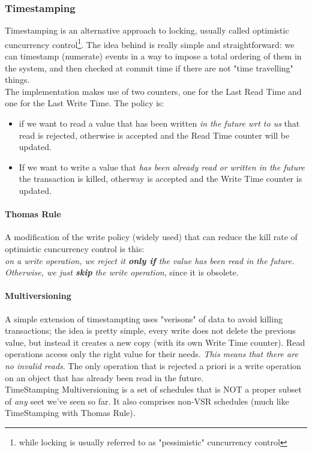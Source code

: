 \documentclass{article}
\begin{document}
				\subsubsection{Timestamping}
					Timestamping is an alternative approach to locking, usually called optimistic cuncurrency control\footnote{while locking is usually referred to as "pessimistic" cuncurrency control}. The idea behind is really simple and straightforward: we can timestamp (numerate) events in a way to impose a total ordering of them in the system, and then checked at commit time if there are not "time travelling" things. \\
					The implementation makes use of two counters, one for the Last Read Time and one for the Last Write Time. The policy is: 
					\begin{itemize}
						\item if we want to read a value that has been written \textit{in the future wrt to us} that read is rejected, otherwise is accepted and the Read Time counter will be updated.
						\item If we want to write a value that \textit{has been already read or written in the future} the transaction is killed, otherway is accepted and the Write Time counter is updated.
					\end{itemize}

					\paragraph{Thomas Rule}
						A modification of the write policy (widely used) that can reduce the kill rate of optimistic cuncurrency control is this:\\
						\textit{on a write operation, we reject it \textbf{only if} the value has been read in the future. Otherwise, we just \textbf{skip} the write operation}, since it is obsolete.

					\paragraph{Multiversioning}
						A simple extension of timestampting uses "verisons" of data to avoid killing transactions; the idea is pretty simple, every write does not delete the previous value, but instead it creates a new copy (with its own Write Time counter). Read operations access only the right value for their needs. \textit{This means that there are no invalid reads}. The only operation that is rejected a priori is a write operation on an object that has already been read in the future.\\
						TimeStamping Multiversioning is a set of schedules that is NOT a proper subset of \textit{any} seet we've seen so far. It also comprises non-VSR schedules (much like TimeStamping with Thomas Rule).
	
\end{document}
